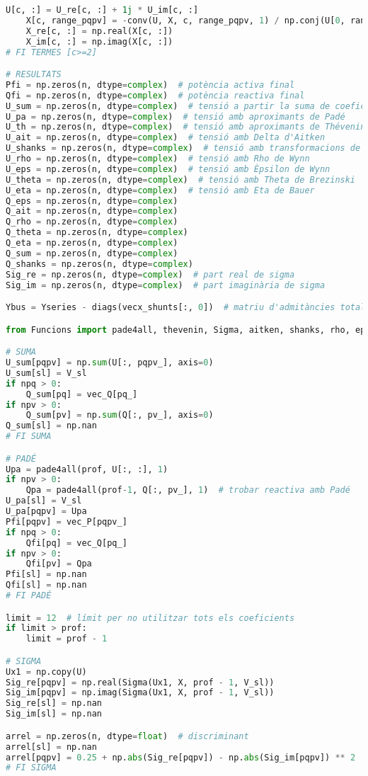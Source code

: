 \begin{lstlisting}[language=Python,numbers=none]
    U[c, :] = U_re[c, :] + 1j * U_im[c, :]
    X[c, range_pqpv] = -conv(U, X, c, range_pqpv, 1) / np.conj(U[0, range_pqpv])
    X_re[c, :] = np.real(X[c, :])
    X_im[c, :] = np.imag(X[c, :])
# FI TERMES [c>=2]

# RESULTATS
Pfi = np.zeros(n, dtype=complex)  # potència activa final
Qfi = np.zeros(n, dtype=complex)  # potència reactiva final
U_sum = np.zeros(n, dtype=complex)  # tensió a partir la suma de coeficients
U_pa = np.zeros(n, dtype=complex)  # tensió amb aproximants de Padé
U_th = np.zeros(n, dtype=complex)  # tensió amb aproximants de Thévenin
U_ait = np.zeros(n, dtype=complex)  # tensió amb Delta d'Aitken
U_shanks = np.zeros(n, dtype=complex)  # tensió amb transformacions de Shanks
U_rho = np.zeros(n, dtype=complex)  # tensió amb Rho de Wynn
U_eps = np.zeros(n, dtype=complex)  # tensió amb Èpsilon de Wynn
U_theta = np.zeros(n, dtype=complex)  # tensió amb Theta de Brezinski
U_eta = np.zeros(n, dtype=complex)  # tensió amb Eta de Bauer
Q_eps = np.zeros(n, dtype=complex)
Q_ait = np.zeros(n, dtype=complex)
Q_rho = np.zeros(n, dtype=complex)
Q_theta = np.zeros(n, dtype=complex)
Q_eta = np.zeros(n, dtype=complex)
Q_sum = np.zeros(n, dtype=complex)
Q_shanks = np.zeros(n, dtype=complex)
Sig_re = np.zeros(n, dtype=complex)  # part real de sigma
Sig_im = np.zeros(n, dtype=complex)  # part imaginària de sigma

Ybus = Yseries - diags(vecx_shunts[:, 0])  # matriu d'admitàncies total

from Funcions import pade4all, thevenin, Sigma, aitken, shanks, rho, epsilon, theta, eta  # importar funcions

# SUMA
U_sum[pqpv] = np.sum(U[:, pqpv_], axis=0)
U_sum[sl] = V_sl
if npq > 0:
    Q_sum[pq] = vec_Q[pq_]
if npv > 0:
    Q_sum[pv] = np.sum(Q[:, pv_], axis=0)
Q_sum[sl] = np.nan
# FI SUMA

# PADÉ
Upa = pade4all(prof, U[:, :], 1)
if npv > 0:
    Qpa = pade4all(prof-1, Q[:, pv_], 1)  # trobar reactiva amb Padé
U_pa[sl] = V_sl
U_pa[pqpv] = Upa
Pfi[pqpv] = vec_P[pqpv_]
if npq > 0:
    Qfi[pq] = vec_Q[pq_]
if npv > 0:
    Qfi[pv] = Qpa
Pfi[sl] = np.nan
Qfi[sl] = np.nan
# FI PADÉ

limit = 12  # límit per no utilitzar tots els coeficients
if limit > prof:
    limit = prof - 1

# SIGMA
Ux1 = np.copy(U)
Sig_re[pqpv] = np.real(Sigma(Ux1, X, prof - 1, V_sl))
Sig_im[pqpv] = np.imag(Sigma(Ux1, X, prof - 1, V_sl))
Sig_re[sl] = np.nan
Sig_im[sl] = np.nan

arrel = np.zeros(n, dtype=float)  # discriminant
arrel[sl] = np.nan
arrel[pqpv] = 0.25 + np.abs(Sig_re[pqpv]) - np.abs(Sig_im[pqpv]) ** 2
# FI SIGMA


\end{lstlisting}
